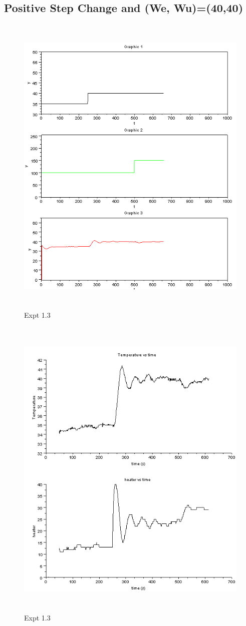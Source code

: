 \subsection{Positive Step Change and (We, Wu)=(40,40)}
\begin{figure}[H]
  \includegraphics[width=12cm, height=15cm]{mpc/1_3.PNG}
  \caption{ Expt 1.3}
\end{figure}
\begin{figure}[H]
  \includegraphics[width=12cm, height=15cm]{mpc/1_3_heater_final.png}
  \caption{Expt 1.3}
\end{figure}
